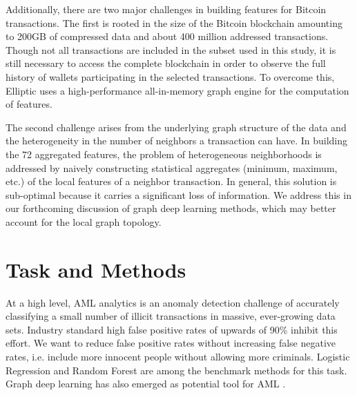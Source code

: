 \documentclass[sigconf,submission]{acmart}
\begin{document}

Additionally, there are two major challenges in building features for Bitcoin transactions. The first is rooted in the size of the Bitcoin blockchain amounting to 200GB of compressed data and about 400 million addressed transactions. Though not all transactions are included in the subset used in this study, it is still necessary to access the complete blockchain in order to observe the full history of wallets participating in the selected transactions. To overcome this, Elliptic uses a high-performance all-in-memory graph engine for the computation of features.

The second challenge arises from the underlying graph structure of the data and the heterogeneity in the number of neighbors a transaction can have. In building the 72 aggregated features, the problem of heterogeneous neighborhoods is addressed by naively constructing statistical aggregates (minimum, maximum, etc.) of the local features of a neighbor transaction. In general, this solution is sub-optimal because it carries a significant loss of information. We address this in our forthcoming discussion of graph deep learning methods, which may better account for the local graph topology.

\section{Task and Methods}
At a high level, AML analytics is an anomaly detection challenge of accurately classifying a small number of illicit transactions in massive, ever-growing data sets. Industry standard high false positive rates of upwards of 90\% inhibit this effort. We want to reduce false positive rates without increasing false negative rates, i.e. include more innocent people without allowing more criminals. Logistic Regression and Random Forest are among the benchmark methods for this task. Graph deep learning has also emerged as potential tool for AML \cite{Weber}.
\end{document}
